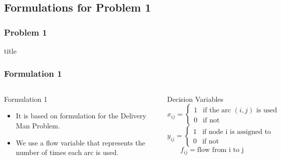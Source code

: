 \documentclass[aspectratio=169]{beamer}
\begin{document}

\subsection{Formulations for Problem 1}
\begin{frame}
\frametitle{Problem 1}
  \begin{beamercolorbox}[sep=8pt,center,shadow=true,rounded=true]{title}
  \end{beamercolorbox}
  \vspace{\baselineskip}
\end{frame}

\begin{frame}
\frametitle{Formulation 1}
\begin{columns}
\begin{block}{Formulation 1}
\begin{itemize}
\item It is based on \cite{Fischetti:1993} formulation for the Delivery Man Problem.
\item We use a flow variable that represents the number of times each arc is used.
\end{itemize}
\end{block}
\begin{block}{Decision Variables}
\[x_{ij}={\begin{cases}1&{\mbox{if the arc $(i,j)$ is used }}\\0&{\mbox{if not}}\end{cases}}
\]
\[y_{ij}={\begin{cases}1&{\mbox{if node i is assigned to node j}}\\0&{\mbox{if not}}\end{cases}}
\]
\[f_{ij} = \mbox{flow from i to j}
\]
\end{block}
\end{columns}
\end{frame}
\end{document}
